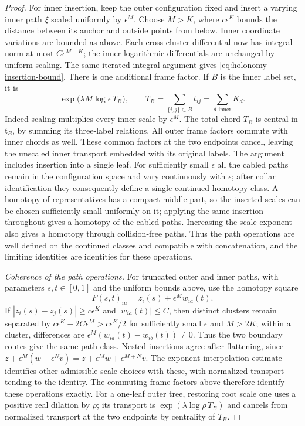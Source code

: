 \begin{proof}
For inner insertion, keep the outer configuration fixed and insert a
varying inner path $\xi$ scaled uniformly by $\epsilon^M$.  Choose
$M>K$, where $c\epsilon^K$ bounds the distance between its anchor and
outside points from below.  Inner coordinate variations are bounded
as above.  Each cross-cluster differential now has integral norm at
most $C\epsilon^{M-K}$; the inner logarithmic differentials are
unchanged by uniform scaling.  The same iterated-integral argument
gives \eqref{eq:holonomy-insertion-bound}.  There is one additional
frame factor.  If $B$ is the inner label set, it is
\begin{equation}\label{eq:holonomy-central-scale}
 \exp\bigl(\lambda M\log\epsilon\,T_B\bigr),
 \qquad T_B=\sum_{\{i,j\}\subset B}t_{ij}
          =\sum_{d\text{ inner}}K_d.
\end{equation}
Indeed scaling multiplies every inner scale by $\epsilon^M$.
The total chord $T_B$ is central in $\mathfrak t_B$, by summing its
three-label relations.  All outer frame factors commute with inner
chords as well.  These common factors at the two endpoints cancel,
leaving the unscaled inner transport embedded with its original
labels.  The argument includes insertion into a single leaf.
For sufficiently small $\epsilon$ all the cabled paths remain in the
configuration space and vary continuously with $\epsilon$; after
collar identification they consequently define a single continued
homotopy class.  A homotopy of representatives has a compact middle
part, so the inserted scales can be chosen sufficiently small uniformly
on it; applying the same insertion throughout gives a homotopy of the
cabled paths.  Increasing the scale exponent also gives a homotopy
through collision-free paths.  Thus the path operations are well
defined on the continued classes and compatible with concatenation,
and the limiting identities are identities for these operations.

\emph{Coherence of the path operations.}
For truncated outer and inner paths, with parameters $s,t\in[0,1]$
and the uniform bounds above, use the homotopy square
\[
 F(s,t)_{ia}=z_i(s)+\epsilon^M w_{ia}(t).
\]
If $|z_i(s)-z_j(s)|\ge c\epsilon^K$ and
$|w_{ia}(t)|\le C$, then distinct clusters remain separated by
$c\epsilon^K-2C\epsilon^M>c\epsilon^K/2$ for sufficiently small
$\epsilon$ and $M>2K$; within a cluster, differences are
$\epsilon^M(w_{ia}(t)-w_{ib}(t))\ne0$.  Thus the two boundary
routes give the same path class.  Nested insertions agree after
flattening, since
$z+\epsilon^M(w+\epsilon^Nv)=z+\epsilon^Mw+\epsilon^{M+N}v$.
The exponent-interpolation estimate identifies other admissible
scale choices with these, with normalized transport tending to the
identity.  The commuting frame factors above therefore identify
these operations exactly.  For a one-leaf outer tree, restoring
root scale one uses a positive real dilation by $\rho$; its transport
is $\exp(\lambda\log\rho\,T_B)$ and cancels from normalized transport
at the two endpoints by centrality of $T_B$.


\end{proof}
